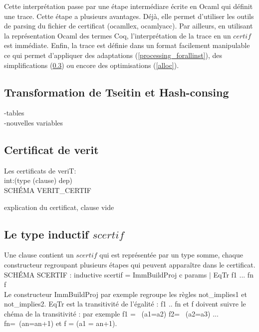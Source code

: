 \documentclass[11pt]{article}
\begin{document}
Cette interprétation passe par une étape intermédiare écrite en Ocaml qui définit une trace. Cette étape a plusieurs avantages. Déjà, elle permet d'utiliser les outils de parsing du fichier de certificat (ocamllex, ocamlyacc). Par ailleurs, en utilisant la représentation Ocaml des termes Coq, l'interprétation de la trace en un $certif$ est immédiate. Enfin, la trace est définie dans un format facilement manipulable ce qui permet d'appliquer des adaptations (\ref{processing_forallinst}), des simplifications (\ref{regroupement}) ou encore des optimisations (\ref{alloc}).




\subsection{Transformation de Tseitin et Hash-consing}

-tables \\
-nouvelles variables

\subsection{Certificat de verit}

Les certificats de veriT:\\
int:(type (clause) dep) \\

SCHÉMA VERIT\_CERTIF

explication du certificat, clause vide

 \subsection{Le type inductif $scertif$}\label{regroupement}



Une clause contient un $scertif$  qui est représentée par un type somme, chaque constructeur regroupant plusieurs étapes qui peuvent apparaître dans le certificat.\\

SCHÉMA SCERTIF : inductive scertif = ImmBuildProj c params $|$ EqTr f1 ... fn f \\

Le constructeur ImmBuildProj par exemple regroupe les règles not\_implies1 et not\_implies2. EqTr est la transitivité de l'égalité : f1 .. fn et f doivent suivre le chéma de la transitivité : par exemple f1 = ~(a1=a2) f2= ~(a2=a3) ... fn=~(an=a{n+1}) et f = (a1 = a{n+1}).\\
\end{document}
